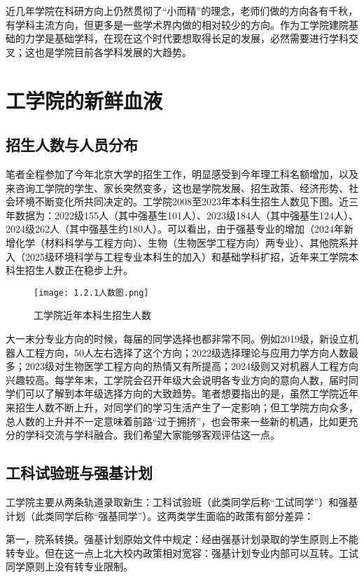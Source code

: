 \documentclass[11pt,oneside]{book}
\begin{document}
近几年学院在科研方向上仍然贯彻了“小而精”的理念，老师们做的方向各有千秋，有学科主流方向，但更多是一些学术界内做的相对较少的方向。作为工学院建院基础的力学是基础学科，在现在这个时代要想取得长足的发展，必然需要进行学科交叉；这也是学院目前各学科发展的大趋势。

\section{工学院的新鲜血液}    
\subsection{招生人数与人员分布}
笔者全程参加了今年北京大学的招生工作，明显感受到今年理工科名额增加，以及来咨询工学院的学生、家长突然变多，这也是学院发展、招生政策、经济形势、社会环境不断变化所共同决定的。工学院2008至2023年本科生招生人数见下图。近三年数据为：2022级155人（其中强基生101人）、2023级184人（其中强基生124人）、2024级262人（其中强基生约180人）。可以看出，由于强基专业的增加（2024年新增化学（材料科学与工程方向）、生物（生物医学工程方向）两专业）、其他院系并入（2025级环境科学与工程专业本科生的加入）和基础学科扩招，近年来工学院本科生招生人数正在稳步上升。

\begin{figure}[htbp]
    \centering
    \texttt{[image: 1.2.1人数图.png]} %
    \renewcommand{\figurename}{图}
    \caption{工学院近年本科生招生人数}
    \label{fig:enter-label}
\end{figure}
        
大一末分专业方向的时候，每届的同学选择也都非常不同。例如2019级，新设立机器人工程方向，50人左右选择了这个方向；2022级选择理论与应用力学方向人数最多；2023级对生物医学工程方向的热情又有所提高；2024级则又对机器人工程方向兴趣较高。每学年末，工学院会召开年级大会说明各专业方向的意向人数，届时同学们可以了解到本年级选择方向的大致趋势。笔者想要指出的是，虽然工学院近年来招生人数不断上升，对同学们的学习生活产生了一定影响；但工学院方向众多，总人数的上升并不一定意味着前路“过于拥挤”，也会带来一些新的机遇，比如更充分的学科交流与学科融合。我们希望大家能够客观评估这一点。
        
\subsection{工科试验班与强基计划}
工学院主要从两条轨道录取新生：工科试验班（此类同学后称“工试同学”）和强基计划（此类同学后称“强基同学”）。这两类学生面临的政策有部分差异：

第一，院系转换。强基计划原始文件中规定：经由强基计划录取的学生原则上不能转专业。但在这一点上北大校内政策相对宽容：强基计划专业内部可以互转。工试同学原则上没有转专业限制。
\end{document}
